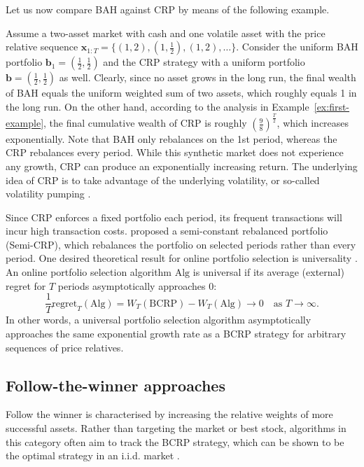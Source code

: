 Let us now compare BAH against CRP by means of the following example.
\begin{example}
\label{ex:second-example}
Assume a two-asset market with cash and one volatile asset with the price relative sequence $\mathbf{x}_{1:T} = \{(1, 2), (1, \frac{1}{2}), (1, 2), \ldots\}$. Consider the uniform BAH portfolio $\mathbf{b}_1 = (\frac{1}{2}, \frac{1}{2})$ and the CRP strategy with a uniform portfolio $\mathbf{b} = (\frac{1}{2}, \frac{1}{2})$ as well. Clearly, since no asset grows in the long run, the final wealth of BAH equals the uniform weighted sum of two assets, which roughly equals 1 in the long run. On the other hand, according to the analysis in Example~\ref{ex:first-example}, the final cumulative wealth of CRP is roughly $(\frac{9}{8})^\frac{T}{2}$, which increases exponentially. Note that BAH only rebalances on the 1st period, whereas the CRP rebalances every period. While this synthetic market does not experience any growth, CRP can produce an exponentially increasing return. The underlying idea of CRP is to take advantage of the underlying volatility, or so-called volatility pumping \citep[Chapter~15]{luenberger98}.

Since CRP enforces a fixed portfolio each period, its frequent transactions will incur high transaction costs. \citet{eg} proposed a semi-constant rebalanced portfolio (Semi-CRP), which rebalances the portfolio on selected periods rather than every period. One desired theoretical result for online portfolio selection is universality \citep{cover}. An online portfolio selection algorithm $\mathrm{Alg}$ is universal if its average (external) regret \citep{stoltz05, blum07} for $T$ periods asymptotically approaches 0:
\begin{equation}
	\frac{1}{T}\mathrm{regret}_{T}(\mathrm{Alg}) = W_{T}(\mathrm{BCRP}) - W_{T}(\mathrm{Alg}) \rightarrow 0 \quad \text{as } T \rightarrow \infty.
\end{equation}
In other words, a universal portfolio selection algorithm asymptotically approaches the same exponential growth rate as a BCRP strategy for arbitrary sequences of price relatives.
\end{example}

\subsection{Follow-the-winner approaches}
\label{sec:follow-the-winner}

Follow the winner is characterised by increasing the relative weights of more successful assets. Rather than targeting the market or best stock, algorithms in this category often aim to track the BCRP strategy, which can be shown to be the optimal strategy in an i.i.d. market \citep[Theorem~15.3.1]{cover-book}.


